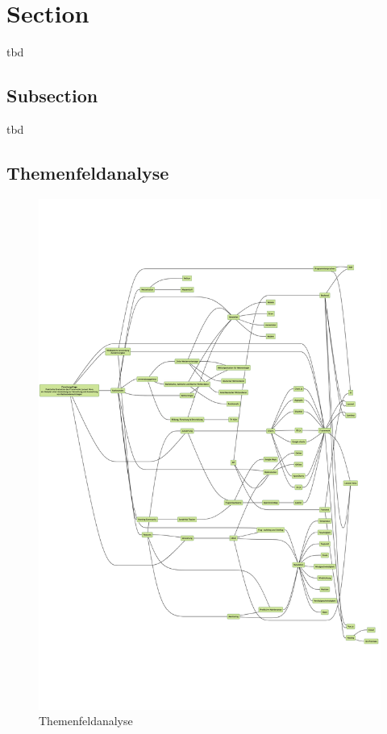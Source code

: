 \newpage


\section{Section}
tbd

\subsection{Subsection}
tbd~\cite{laravel-nova-docs}

\newpage

\subsection{Themenfeldanalyse}
\begin{figure}[h!]
    \centering
    \caption{Themenfeldanalyse}
    \label{fig:themenfeldanalyse}
    \includegraphics[scale=0.23]{images/themenfeldanalyse}
\end{figure}
